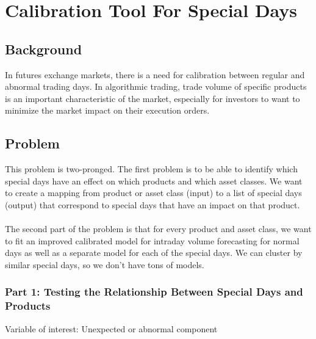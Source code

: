 \documentclass[11pt]{article}
\begin{document}
\newpage

\section*{Calibration Tool For Special Days}
\subsection*{Background} 
In futures exchange markets, there is a need for calibration between regular and abnormal trading days. In algorithmic trading, trade volume of specific products is an important characteristic of the market, especially for investors to want to minimize the market impact on their execution orders.


\subsection*{Problem} 
This problem is two-pronged. The first problem is to be able to identify which special days have an effect on which products and which asset classes. We want to create a mapping from product or asset class (input) to a list of special days (output) that correspond to special days that have an impact on that product. 
\\\\The second part of the problem is that for every product and asset class, we want to fit an improved calibrated model for intraday volume forecasting for normal days as well as a separate model for each of the special days. We can cluster by similar special days, so we don't have tons of models. 
\subsubsection*{Part 1: Testing the Relationship Between Special Days and Products}
Variable of interest: Unexpected or abnormal component
\end{document}
